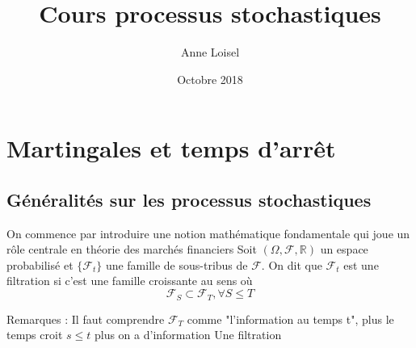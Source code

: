 \documentclass{article}
\title{Cours processus stochastiques}
\author{Anne Loisel}
\date{Octobre 2018}
\begin{document}
\maketitle
\chapter{Martingales et temps d'arrêt}
\section{Généralités sur les processus stochastiques}
On commence par introduire une notion mathématique fondamentale qui joue un rôle centrale en théorie des marchés financiers
\newline
\newline
Soit $(\Omega, \mathscr{F}, \mathbb{R})$ un espace probabilisé et $\{\mathscr{F}_{t}\}$ une famille de sous-tribus de $\mathscr{F}$. On dit que ${\mathscr{F}_{t}}$ est une filtration si c'est une famille croissante au sens où
\[\mathscr{F}_{S} \subset \mathscr{F}_{T}, \forall S \leq T \]

Remarques :
Il faut comprendre $\mathscr{F}_{T}$ comme "l'information au temps t", plus le temps croit $s \leq t$ plus on a d'information
Une filtration 
\end{document}
